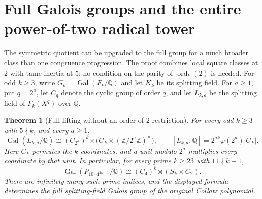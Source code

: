 \documentclass[11pt,a4paper]{article}
\newtheorem{theorem}{Theorem}[section]
\theoremstyle{definition}
\theoremstyle{remark}
\numberwithin{equation}{section}
\begin{document}


\section{Full Galois groups and the entire power-of-two radical tower}
\label{D:sec:full}
The symmetric quotient can be upgraded to the full group for a much broader
class than one congruence progression. The proof combines local square classes
at $2$ with tame inertia at $5$; no condition on the parity of
$\operatorname{ord}_k(2)$ is needed. For odd $k\ge3$, write
$G_k=\operatorname{Gal}(F_k/\mathbb Q)$ and let $K_k$ be its splitting field.
For $a\ge1$, put $q=2^a$, let $C_q$ denote the cyclic group of order $q$,
and let $L_{k,a}$ be the splitting field of $F_k(X^q)$ over $\mathbb Q$.

\begin{theorem}[Full lifting without an order-of-$2$ restriction]
\label{D:thm:full-lifting}
For every odd $k\ge3$ with $5\nmid k$, and every $a\ge1$,
\[
 \operatorname{Gal}(L_{k,a}/\mathbb Q)
 \cong (C_{2^a})^k\rtimes
 \bigl(G_k\times(\mathbb Z/2^a\mathbb Z)^\times\bigr),
 \qquad
 [L_{k,a}:\mathbb Q]=2^{ak}\varphi(2^a)|G_k|.
\]
Here $G_k$ permutes the $k$ coordinates, and a unit modulo $2^a$
multiplies every coordinate by that unit. In particular, for every prime
$k\ge23$ with $11\nmid k+1$,
\[
 \boxed{\operatorname{Gal}(P_{10\cdot4^{2k-1}}/\mathbb Q)
       \cong(C_4)^k\rtimes(S_k\times C_2).}
\]
There are infinitely many such prime indices, and the displayed formula
determines the full splitting-field Galois group of the original Collatz
polynomial.
\end{theorem}
\end{document}
